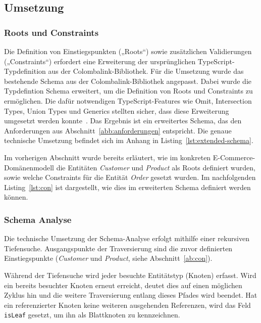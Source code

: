 \subsection{Umsetzung}

\subsubsection{Roots und Constraints}
Die Definition von Einstiegspunkten („Roots“) sowie zusätzlichen Validierungen („Constraints“) erfordert eine Erweiterung der ursprünglichen TypeScript-Typdefinition aus der Colombalink-Bibliothek. Für die Umsetzung wurde das bestehende Schema aus der Colombalink-Bibliothek angepasst. Dabei wurde die Typdefintion Schema erweitert, um die Definition von Roots und Constraints zu ermöglichen. Die dafür notwendigen TypeScript-Features wie Omit, Intersection Types, Union Types und Generics stellten sicher, dass diese Erweiterung umgesetzt werden konnte~\cite{typescript:handbook}. Das Ergebnis ist ein erweitertes Schema, das den Anforderungen aus Abschnitt~\ref{abb:anforderungen} entspricht. Die genaue technische Umsetzung befindet sich im Anhang in Listing~\ref{lst:extended-schema}.

Im vorherigen Abschnitt wurde bereits erläutert, wie im konkreten E-Commerce-Domänen\-modell die Entitäten \textit{Customer} und \textit{Product} als Roots definiert wurden, sowie welche Constraints für die Entität \textit{Order} gesetzt wurden. Im nachfolgenden Listing~\ref{lst:con} ist dargestellt, wie dies im erweiterten Schema definiert werden können.

\newpage


\newpage
\subsubsection{Schema Analyse}
Die technische Umsetzung der Schema-Analyse erfolgt mithilfe einer rekursiven Tiefensuche. Ausgangspunkte der Traversierung sind die zuvor definierten Einstiegspunkte (\textit{Customer} und \textit{Product}, siehe Abschnitt~\ref{ab:con}).

Während der Tiefensuche wird jeder besuchte Entitätstyp (Knoten) erfasst. Wird ein bereits besuchter Knoten erneut erreicht, deutet dies auf einen möglichen Zyklus hin und die weitere Traversierung entlang dieses Pfades wird beendet. Hat ein referenzierter Knoten keine weiteren ausgehenden Referenzen, wird das Feld \texttt{isLeaf} gesetzt, um ihn als Blattknoten zu kennzeichnen.

